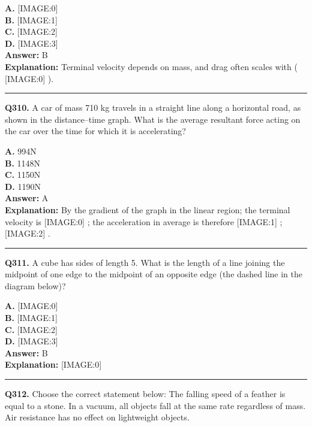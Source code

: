 \documentclass[12pt]{article}
\begin{document}
\textbf{A.} [IMAGE:0] \\
\textbf{B.} [IMAGE:1] \\
\textbf{C.} [IMAGE:2] \\
\textbf{D.} [IMAGE:3] \\

\textbf{Answer:} B \\
\textbf{Explanation:} Terminal velocity depends on mass, and drag often scales with (
[IMAGE:0]
).

\hrule
\vspace{1em}


\noindent
\textbf{Q310.} A car of mass 710 kg travels in a straight line along a horizontal road, as shown in the distance–time graph.
What is the average resultant force acting on the car over the time for which it is accelerating?



\textbf{A.} 994N \\
\textbf{B.} 1148N \\
\textbf{C.} 1150N \\
\textbf{D.} 1190N \\

\textbf{Answer:} A \\
\textbf{Explanation:} By the gradient of the graph in the linear region; the terminal velocity is
[IMAGE:0]
; the acceleration in average is therefore
[IMAGE:1]
;
[IMAGE:2]
.

\hrule
\vspace{1em}


\noindent
\textbf{Q311.} A cube has sides of length 5. What is the length of a line joining the midpoint of one edge to the midpoint of an opposite edge (the dashed line in the diagram below)?



\textbf{A.} [IMAGE:0] \\
\textbf{B.} [IMAGE:1] \\
\textbf{C.} [IMAGE:2] \\
\textbf{D.} [IMAGE:3] \\

\textbf{Answer:} B \\
\textbf{Explanation:} [IMAGE:0]

\hrule
\vspace{1em}


\noindent
\textbf{Q312.} Choose the correct statement below:
The falling speed of a feather is equal to a stone.
In a vacuum, all objects fall at the same rate regardless of mass.
Air resistance has no effect on lightweight objects.
\end{document}
